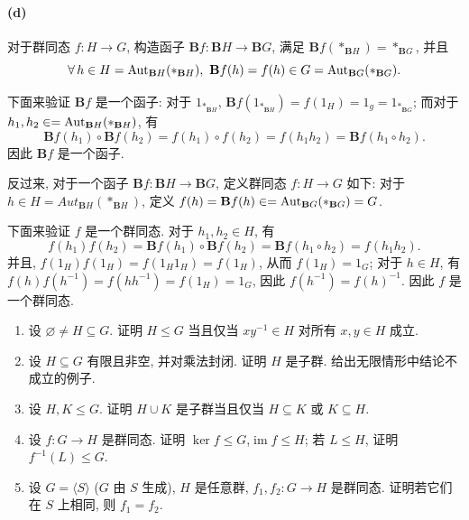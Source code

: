 \documentclass{article}
\begin{document}
\begin{solution}
	\paragraph{(d)} 对于群同态 $f: H \to G$, 构造函子 $\mathbf{B}f: \mathbf{B}H \to \mathbf{B}G$, 满足 $\mathbf{B}f(*_{\mathbf{B}H}) = *_{\mathbf{B}G}$, 并且
	\[ \forall\,h\in H = \operatorname{Aut}_{\mathbf{B}H}(*_{\mathbf{B}H}),\  \mathbf{B}f(h) = f(h) \in G = \operatorname{Aut}_{\mathbf{B}G}(*_{\mathbf{B}G}). \]

	下面来验证 $\mathbf{B}f$ 是一个函子: 对于 $1_{*_{\mathbf{B}H}}$, $\mathbf{B}f(1_{*_{\mathbf{B}H}}) = f(1_H) = 1_g = 1_{*_{\mathbf{B}G}}$; 而对于 $h_1,h_2 \in = \operatorname{Aut}_{\mathbf{B}H}(*_{\mathbf{B}H})$, 有
	\[ \mathbf{B}f(h_1) \circ \mathbf{B}f(h_2) = f(h_1) \circ f(h_2) = f(h_1h_2) = \mathbf{B}f(h_1\circ h_2). \]
	因此 $\mathbf{B}f$ 是一个函子. 

	反过来, 对于一个函子 $\mathbf{B}f: \mathbf{B}H \to \mathbf{B}G$, 定义群同态 $f: H \to G$ 如下: 对于 $h \in H = Aut_{\mathbf{B}H}(*_{\mathbf{B}H})$, 定义 $f(h) = \mathbf{B}f(h) \in = \operatorname{Aut}_{\mathbf{B}G}(*_{\mathbf{B}G}) = G$. 
	
	下面来验证 $f$ 是一个群同态. 对于 $h_1,h_2 \in H$, 有
	\[ f(h_1)f(h_2) = \mathbf{B}f(h_1) \circ \mathbf{B}f(h_2) = \mathbf{B}f(h_1\circ h_2) = f(h_1h_2). \]
	并且, $f(1_H)f(1_H) = f(1_H1_H) = f(1_H)$, 从而 $f(1_H) = 1_G$; 对于 $h\in H$, 有 $f(h)f(h^{-1}) = f(hh^{-1}) = f(1_H) = 1_G$, 因此 $f(h^{-1}) = f(h)^{-1}$.
	因此 $f$ 是一个群同态.
\end{solution}



\begin{problem}
  \begin{enumerate}
    \item[(a)] 设 $\varnothing\neq H\subseteq G$. 证明 $H\leq G$ 当且仅当 $xy^{-1}\in H$ 对所有 $x,y\in H$ 成立.
    \item[(b)] 设 $H\subseteq G$ 有限且非空, 并对乘法封闭. 证明 $H$ 是子群. 给出无限情形中结论不成立的例子.
    \item[(c)] 设 $H,K\leq G$. 证明 $H\cup K$ 是子群当且仅当 $H\subseteq K$ 或 $K\subseteq H$.
    \item[(d)] 设 $f:G\to H$ 是群同态. 证明 $\ker f\leq G$,$\operatorname{im}f\leq H$; 若 $L\leq H$, 证明 $f^{-1}(L)\leq G$.
    \item[(e)] 设 $G=\langle S\rangle$ ($G$ 由 $S$ 生成), $H$ 是任意群, $f_1,f_2:G\to H$ 是群同态. 证明若它们在 $S$ 上相同, 则 $f_1=f_2$.
  \end{enumerate}
\end{problem}
\end{document}
